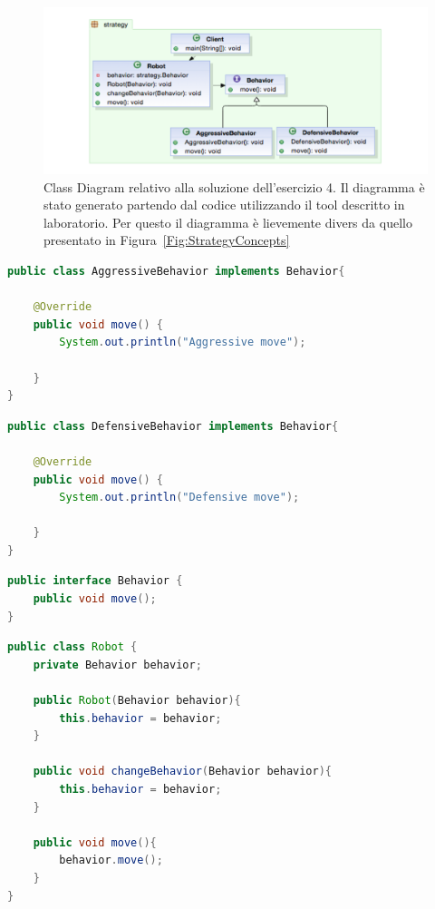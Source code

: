 \documentclass{article}
\begin{document}
\begin{figure}[h]
\includegraphics[width=1\textwidth]{Img/StrategyEsercizio4.pdf}
\caption{Class Diagram relativo alla soluzione dell'esercizio 4. Il diagramma \`e stato generato partendo dal codice utilizzando il tool descritto in laboratorio. Per questo il diagramma \`e lievemente divers da quello presentato in Figura~\ref{Fig:StrategyConcepts}}
\label{Fig:strategy}
\end{figure}

\begin{lstlisting}[language=Java]
public class AggressiveBehavior implements Behavior{

	@Override
	public void move() {
		System.out.println("Aggressive move");
		
	}
}
\end{lstlisting}

\begin{lstlisting}[language=Java]
public class DefensiveBehavior implements Behavior{

	@Override
	public void move() {
		System.out.println("Defensive move");
		
	}
}
\end{lstlisting}

\begin{lstlisting}[language=Java]
public interface Behavior {
	public void move();	
}
\end{lstlisting}


\begin{lstlisting}[language=Java]
public class Robot {
	private Behavior behavior;
	
	public Robot(Behavior behavior){
		this.behavior = behavior;		
	}
	
	public void changeBehavior(Behavior behavior){
		this.behavior = behavior;	
	}
	
	public void move(){
		behavior.move();
	}
}
\end{lstlisting}
\end{document}
